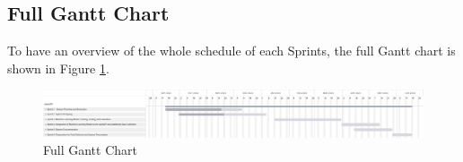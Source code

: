 \subsection{Full Gantt Chart}
\label{subsec:gantt_chart_full}
To have an overview of the whole schedule of each Sprints, 
the full Gantt chart is shown in Figure \ref{fig:gantt_chart_full}.
\begin{figure}[ht]
    \centering
    \includegraphics[width=1\textwidth]{./assets/Chapter_3/Gantt/Gantt_Chart_Full.png}
    \caption{Full Gantt Chart}
    \label{fig:gantt_chart_full}
\end{figure}
\FloatBarrier